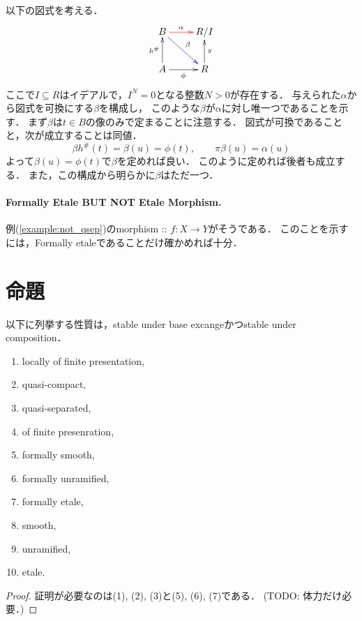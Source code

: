 \documentclass[a4paper]{jsarticle}
\begin{document}
\begin{Example}
    以下の図式を考える．
    \[\xymatrix{
            B \ar@[red][r]^-{\alpha}\ar@[blue][rd]^-{\beta}& R/I \\
            A \ar[u]^-{h^{\#}} \ar[r]_-{\phi}& R \ar[u]_-{\pi}
    }\]
    ここで$I \subseteq R$はイデアルで，$I^N=0$となる整数$N>0$が存在する．
    与えられた$\alpha$から図式を可換にする$\beta$を構成し，
    このような$\beta$が$\alpha$に対し唯一つであることを示す．
    まず$\beta$は$t \in B$の像のみで定まることに注意する．
    図式が可換であることと，次が成立することは同値．
    \[ \beta h^{\#}(t)=\beta(u)=\phi(t), \qquad \pi \beta(u)=\alpha(u) \]
    よって$\beta(u)=\phi(t)$で$\beta$を定めれば良い．
    このように定めれば後者も成立する．
    また，この構成から明らかに$\beta$はただ一つ．

    \paragraph{Formally Etale BUT NOT Etale Morphism.}
    例(\ref{example:not_qsep})のmorphism :: $f \colon X \to Y$がそうである．
    このことを示すには，Formally etaleであることだけ確かめれば十分．

\end{Example}

\section{命題}
\begin{Prop} \label{prop:stable_property}
    以下に列挙する性質は，stable under base excangeかつstable under composition．
    \begin{enumerate}[label=(\arabic*)]
        \item locally of finite presentation,
        \item quasi-compact,
        \item quasi-separated,
        \item of finite presenration,
        \item formally smooth,
        \item formally unramified,
        \item formally etale,
        \item smooth,
        \item unramified,
        \item etale.
    \end{enumerate}    
\end{Prop}
\begin{proof}
    証明が必要なのは(1), (2), (3)と(5), (6), (7)である．
    (TODO: 体力だけ必要．)
\end{proof}
\end{document}
